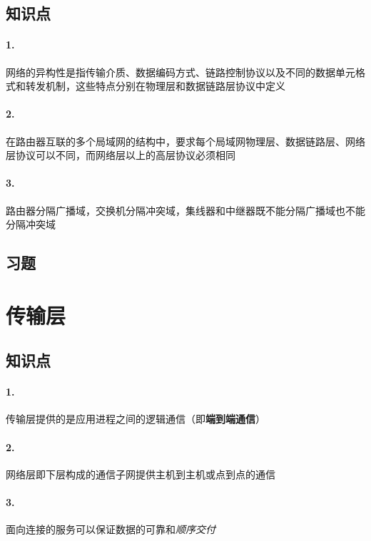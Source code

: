 \documentclass[UTF8]{ctexart} %
\begin{document}
\subsection{知识点}

\paragraph{1.} 网络的异构性是指传输介质、数据编码方式、链路控制协议以及不同的数据单元格式和转发机制，这些特点分别在物理层和数据链路层协议中定义

\paragraph{2.} 在路由器互联的多个局域网的结构中，要求每个局域网物理层、数据链路层、网络层协议可以不同，而网络层以上的高层协议必须相同

\paragraph{3.} 路由器分隔广播域，交换机分隔冲突域，集线器和中继器既不能分隔广播域也不能分隔冲突域

\subsection{习题}

\section{传输层}

\subsection{知识点}

\paragraph{1.} 传输层提供的是应用进程之间的逻辑通信（即\textbf{端到端通信}）

\paragraph{2.} 网络层即下层构成的通信子网提供主机到主机或点到点的通信

\paragraph{3.} 面向连接的服务可以保证数据的可靠和\emph{顺序交付}
\end{document}
